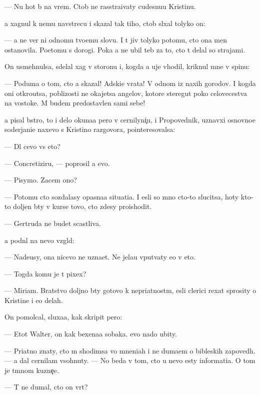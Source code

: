 \documentclass[10pt]{book}
\begin{document}
— Nu hot{\ia} b{\yi} na vrem{\ia}. Ctob{\yi} ne rasstra{\y}ivaty cudesnu{\y}u Kristinu.

{\Y}a xagnul k nemu navstrecu i skazal tak tiho, ctob{\yi} sl{\yi}xal tolyko on:

— {\Y}a ne ver{\io} ni odnomu tvo{\y}emu slovu. I t{\yi} jiv tolyko potomu, cto ona men{\ia} ostanovila. Poetomu s dorogi. Poka {\y}a ne ubil teb{\ia} za to, cto t{\yi} delal so strajami.

On usmehnulsa, sdelal xag v storonu i, kogda {\y}a uje v{\yi}hodil, kriknul mne v spinu:

— Poduma{\y} o tom, cto {\y}a skazal! Adski{\y}e vrata! V odnom iz naxih gorodov. I kogda oni otkro{\y}utsa, poblizosti ne okajetsa angelov, kotor{\yi}{\y}e steregut poko{\y} celovecestva na vostoke. M{\yi} budem predostavlen{\yi} sami sebe!



{\Y}a pisal b{\yi}stro, to i delo okuna{\y}a pero v cernilyni{\c}u, i Propovednik, uznavxi{\y} osnovno{\y}e soderjani{\y}e naxevo s Kristino{\y} razgovora, pointeresovalsa:

— Dl{\ia} cevo vs{\e} eto?

— Concretiziru{\y}, — poprosil {\y}a {\y}evo.

— Pisymo. Zacem ono?

— Potomu cto sozdalasy opasna{\y}a situati{\y}a. I {\y}esli so mno{\y} cto-to slucitsa, hoty kto-to doljen b{\yi}ty v kurse tovo, cto zdesy proishodit.

— Gertruda ne budet scastliva.

{\Y}a podn{\ia}l na nevo vzgl{\ia}d:

— Nade{\y}usy, ona nicevo ne uzna{\y}et. Ne jela{\y}u vput{\yi}vaty {\y}e{\y}o v eto.

— Togda komu je t{\yi} pixex?

— Miriam. Bratstvo doljno b{\yi}ty gotovo k nepri{\y}atnost{\ia}m, {\y}esli clerici rexat sprosity o Kristine i {\y}e{\y}o delah.

On pomolcal, sluxa{\y}a, kak skripit pero:

— Etot Walter, on kak bexena{\y}a sobaka. {\Y}evo nado ubity.

— Pri{\y}atno znaty, cto m{\yi} shodimsa vo mneni{\y}ah i ne duma{\y}em o bible{\y}skih zapoved{\ia}h. — {\Y}a dal cernilam v{\yi}sohnuty. — No beda v tom, cto u nevo {\y}esty informati{\y}a. O tom je t{\e}mnom kuzne{\c}e.

— T{\yi} ne dumal, cto on vr{\e}t?
\end{document}
